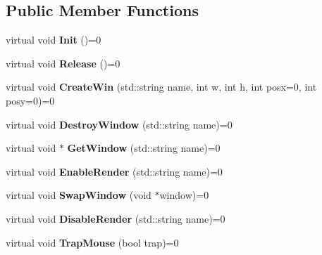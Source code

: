 \subsection*{Public Member Functions}
\begin{DoxyCompactItemize}
\item 
virtual void {\bfseries Init} ()=0\hypertarget{class_i_window_manager_a43e41076eb824b0e52dde29a28db9df8}{}\label{class_i_window_manager_a43e41076eb824b0e52dde29a28db9df8}

\item 
virtual void {\bfseries Release} ()=0\hypertarget{class_i_window_manager_afa49e2a263b7690f2b0745c0534198c8}{}\label{class_i_window_manager_afa49e2a263b7690f2b0745c0534198c8}

\item 
virtual void {\bfseries Create\+Win} (std\+::string name, int w, int h, int posx=0, int posy=0)=0\hypertarget{class_i_window_manager_a721402c56e32650d79fc85982708c991}{}\label{class_i_window_manager_a721402c56e32650d79fc85982708c991}

\item 
virtual void {\bfseries Destroy\+Window} (std\+::string name)=0\hypertarget{class_i_window_manager_aced5a16a6f3f645cbfa3421b20f2bcdb}{}\label{class_i_window_manager_aced5a16a6f3f645cbfa3421b20f2bcdb}

\item 
virtual void $\ast$ {\bfseries Get\+Window} (std\+::string name)=0\hypertarget{class_i_window_manager_a3197d118b10af0d714881c81658ac6da}{}\label{class_i_window_manager_a3197d118b10af0d714881c81658ac6da}

\item 
virtual void {\bfseries Enable\+Render} (std\+::string name)=0\hypertarget{class_i_window_manager_a53ce6ab8759917bba298f8b5146724d0}{}\label{class_i_window_manager_a53ce6ab8759917bba298f8b5146724d0}

\item 
virtual void {\bfseries Swap\+Window} (void $\ast$window)=0\hypertarget{class_i_window_manager_a81d1183a1050b52e9a11fc77b9b297b7}{}\label{class_i_window_manager_a81d1183a1050b52e9a11fc77b9b297b7}

\item 
virtual void {\bfseries Disable\+Render} (std\+::string name)=0\hypertarget{class_i_window_manager_ae639c7c7a6de9a41c2179e61abbf1408}{}\label{class_i_window_manager_ae639c7c7a6de9a41c2179e61abbf1408}

\item 
virtual void {\bfseries Trap\+Mouse} (bool trap)=0\hypertarget{class_i_window_manager_aef2c326099c719fa84afa20c87b156d2}{}\label{class_i_window_manager_aef2c326099c719fa84afa20c87b156d2}


\end{DoxyCompactItemize}
